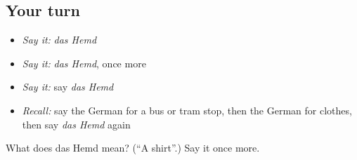 \subsection*{Your turn}
\begin{itemize}
\raggedright
  \item \emph{Say it:} \emph{das Hemd}
  \item \emph{Say it:} \emph{das Hemd}, once more
  \item \emph{Say it:} say \emph{das Hemd}
  \item \emph{Recall:} say the German for a bus or tram stop, then the German for clothes, then say \emph{das Hemd} again
\end{itemize}

\begin{tcolorbox}[breakable,colback=teal!4,colframe=teal!35!black,title={Before you move on}]
What does das Hemd mean? (\textquotedblleft{}A shirt\textquotedblright{}.) Say it once more.
\end{tcolorbox}
